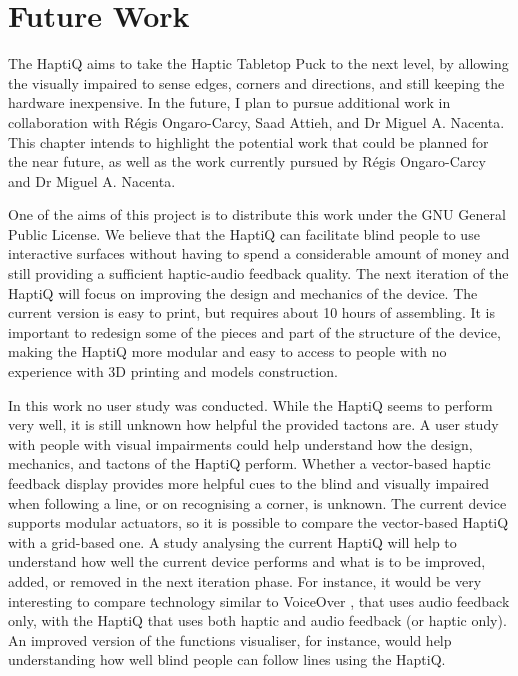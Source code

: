 \chapter{Future Work}
\label{chap:futureWork}

The HaptiQ aims to take the Haptic Tabletop Puck to the next level, by allowing the visually impaired to sense edges, corners and directions, and still keeping the hardware inexpensive. In the future, I plan to pursue additional work in collaboration with Régis Ongaro-Carcy, Saad Attieh, and Dr Miguel A. Nacenta. This chapter intends to highlight the potential work that could be planned for the near future, as well as the work currently pursued by Régis Ongaro-Carcy and Dr Miguel A. Nacenta. 

One of the aims of this project is to distribute this work under the GNU General Public License. We believe that the HaptiQ can facilitate blind people to use interactive surfaces without having to spend a considerable amount of money and still providing a sufficient haptic-audio feedback quality. 
The next iteration of the HaptiQ will focus on improving the design and mechanics of the device. The current version is easy to print, but requires about 10 hours of assembling. It is important to redesign some of the pieces and part of the structure of the device, making the HaptiQ more modular and easy to access to people with no experience with 3D printing and models construction. 

In this work no user study was conducted. While the HaptiQ seems to perform very well, it is still unknown how helpful the provided tactons are. A user study with people with visual impairments could help understand how the design, mechanics, and tactons of the HaptiQ perform. Whether a vector-based haptic feedback display provides more helpful cues to the blind and visually impaired when following a line, or on recognising a corner, is unknown. The current device supports modular actuators, so it is possible to compare the vector-based HaptiQ with a grid-based one. A study analysing the current HaptiQ will help to understand how well the current device performs and what is to be improved, added, or removed in the next iteration phase. For instance, it would be very interesting to compare technology similar to VoiceOver \cite{voiceOver}, that uses audio feedback only, with the HaptiQ that uses both haptic and audio feedback (or haptic only). An improved version of the functions visualiser, for instance, would help understanding how well blind people can follow lines using the HaptiQ.  

